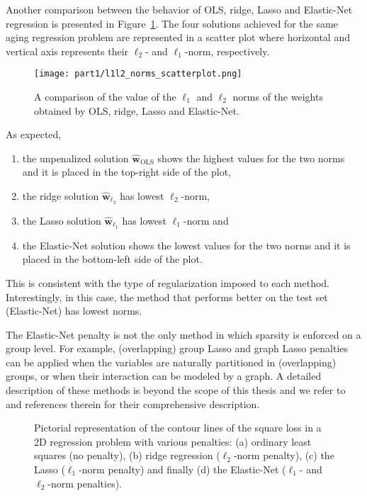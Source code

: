 			Another comparison between the behavior of OLS, ridge, Lasso and Elastic-Net regression is presented in Figure~\ref{fig:l1l2_norms_scatterplot}. The four solutions achieved for the same aging regression problem are represented in a scatter plot where horizontal and vertical axis represents their $\ell_2$- and $\ell_1$-norm, respectively.
			\begin{figure}[!h]
				\centering
				\texttt{[image: part1/l1l2\_norms\_scatterplot.png]}
				\caption{A comparison of the value of the $\ell_1$ and $\ell_2$ norms of the weights obtained by OLS, ridge, Lasso and Elastic-Net.} \label{fig:l1l2_norms_scatterplot}
		  \end{figure}
			As expected,
			\begin{enumerate}
				\item the unpenalized solution $\bm{\hat w}_{\text{OLS}}$ shows the highest values for the two norms and it is placed in the top-right side of the plot,
				\item the ridge solution $\bm{\hat w}_{\ell_2}$ has lowest $\ell_2$-norm,
				\item the Lasso solution $\bm{\hat w}_{\ell_1}$ has lowest $\ell_1$-norm and
				\item the Elastic-Net solution shows the lowest values for the two norms and it is placed in the bottom-left side of the plot.
		  \end{enumerate}
			This is consistent with the type of regularization imposed to each method. Interestingly, in this case, the method that performs better on the test set (Elastic-Net) has lowest norms.

			The Elastic-Net penalty is not the only method in which sparsity is enforced on a group level. For example, (overlapping) group Lasso and graph Lasso penalties can be applied when the variables are naturally partitioned in (overlapping) groups, or when their interaction can be modeled by a graph. A detailed description of these methods is beyond the scope of this thesis and we refer to~\cite{jacob2009group, witten2009covariance} and references therein for their comprehensive description.

			\begin{figure}[h!]
				\centering
				\hfill%
				\caption{Pictorial representation of the contour lines of the square loss in a 2D regression problem with various penalties: (a) ordinary least squares (no penalty), (b) ridge regression ($\ell_2$-norm penalty), (c) the Lasso ($\ell_1$-norm penalty) and finally (d) the Elastic-Net ($\ell_1$- and $\ell_2$-norm penalties).} \label{fig:square_loss_penalties}
			\end{figure}

